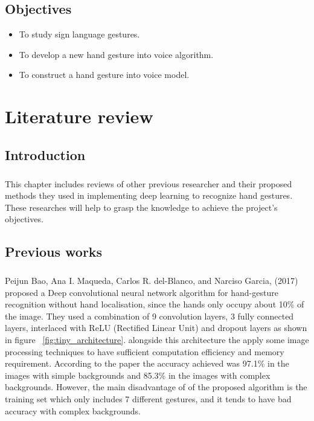 \documentclass[12pt]{report}
\begin{document}
        \section{Objectives}
        \begin{itemize}
            \item To study sign language gestures.
            \item To develop a new hand gesture into voice algorithm.
            \item To construct a hand gesture into voice model.
        \end{itemize}    
    \chapter{Literature review}
        \section{Introduction}
            \paragraph{}
            This chapter includes reviews of other previous researcher
            and their proposed methods they used in implementing deep learning
            to recognize hand gestures. These researches will help to grasp the knowledge
            to achieve the project's objectives. 
        \section{Previous works}
            \paragraph{}
            Peijun Bao, Ana I. Maqueda, Carlos R. del-Blanco, and Narciso Garcia, 
            (2017) proposed a Deep convolutional neural network algorithm for hand-gesture recognition
            without hand localisation, since the hands only occupy about 10\% of the image.
            They used a combination of 9 convolution layers, 3 fully connected layers, interlaced with ReLU 
            (Rectified Linear Unit) and dropout layers as shown in figure ~\ref{fig:tiny_architecture}.
            alongside this architecture the apply some image processing techniques
            to have sufficient computation efficiency and memory requirement.
            According to the paper the accuracy achieved was 97.1\% in the images with simple backgrounds
            and 85.3\% in the images with complex backgrounds.
            However, the main disadvantage of of the proposed algorithm
            is the training set which only includes 7 different gestures,
            and it tends to have bad accuracy with complex backgrounds.
             
\end{document}
